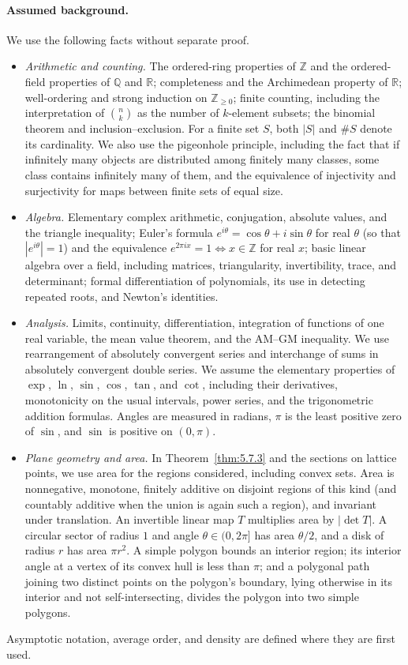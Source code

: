 \documentclass[11pt]{article}
\theoremstyle{ntstyle}
\begin{document}
\paragraph*{Assumed background.}
We use the following facts without separate proof.
\begin{itemize}
	\item \emph{Arithmetic and counting.} The ordered-ring properties of $\mathbb{Z}$ and the
	ordered-field properties of $\mathbb{Q}$ and $\mathbb{R}$; completeness and the Archimedean
	property of $\mathbb{R}$; well-ordering and strong induction on $\mathbb{Z}_{\ge0}$;
		finite counting, including the interpretation of $\binom{n}{k}$ as the number of $k$-element
		subsets; the binomial theorem and inclusion--exclusion.
		For a finite set $S$, both $|S|$ and $\#S$ denote its cardinality.
		We also use the pigeonhole principle, including the fact that if infinitely many objects are
		distributed among finitely many classes, some class contains infinitely many of them, and the
		equivalence of injectivity and surjectivity for maps between finite sets of equal size.
	\item \emph{Algebra.} Elementary complex arithmetic, conjugation, absolute values, and the
	triangle inequality; Euler's formula $e^{i\theta}=\cos\theta+i\sin\theta$ for real $\theta$ (so
	that $|e^{i\theta}|=1$) and the equivalence $e^{2\pi i x}=1\iff x\in\mathbb{Z}$ for real $x$;
	basic linear algebra over a field, including matrices, triangularity, invertibility, trace, and
	determinant; formal differentiation of polynomials, its use in detecting repeated roots, and
	Newton's identities.
	\item \emph{Analysis.} Limits, continuity, differentiation, integration of functions of one real
	variable, the mean value theorem, and the AM--GM inequality.
		We use rearrangement of absolutely convergent series and interchange of sums in absolutely convergent double series.
		We assume the elementary properties of $\exp$, $\ln$, $\sin$, $\cos$, $\tan$, and $\cot$,
		including their derivatives, monotonicity on the usual intervals, power series, and the
		trigonometric addition formulas.
		Angles are measured in radians, $\pi$ is the least positive zero of $\sin$, and $\sin$ is positive on $(0,\pi)$.
	\item \emph{Plane geometry and area.} In Theorem~\ref{thm:5.7.3} and the sections on lattice
	points, we use area for the regions considered, including convex sets.
		Area is nonnegative, monotone, finitely additive on disjoint regions of this kind (and countably
		additive when the union is again such a region), and invariant under translation.
		An invertible linear map $T$ multiplies area by $|\det T|$.
		A circular sector of radius $1$ and angle $\theta\in(0,2\pi]$ has area $\theta/2$, and a disk of
		radius $r$ has area $\pi r^2$.
		A simple polygon bounds an interior region; its interior angle at a vertex of its convex hull is
		less than $\pi$; and a polygonal path joining two distinct points on the polygon's boundary,
		lying otherwise in its interior and not self-intersecting, divides the polygon into two simple
		polygons.
\end{itemize}
Asymptotic notation, average order, and density are defined where they are first used.
\end{document}
